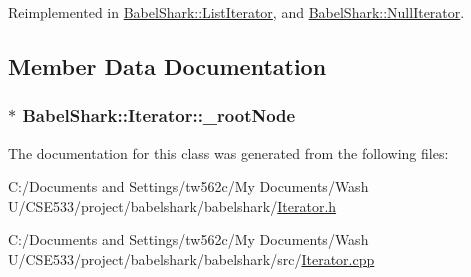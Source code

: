 Reimplemented in \hyperlink{class_babel_shark_1_1_list_iterator_0a902e37bdb11742ed53edb631743ea4}{BabelShark::ListIterator}, and \hyperlink{class_babel_shark_1_1_null_iterator_66a47f978ee58a3ee639494aac25bb7c}{BabelShark::NullIterator}.

\subsection{Member Data Documentation}
\hypertarget{class_babel_shark_1_1_iterator_383dec0e585b2a6dfe787c8cd5ba384a}{
\subsubsection[{\_\-rootNode}]{$\ast$ {\bf BabelShark::Iterator::\_\-rootNode}}}
\label{class_babel_shark_1_1_iterator_383dec0e585b2a6dfe787c8cd5ba384a}




The documentation for this class was generated from the following files:\begin{CompactItemize}
\item 
C:/Documents and Settings/tw562c/My Documents/Wash U/CSE533/project/babelshark/babelshark/\hyperlink{_iterator_8h}{Iterator.h}\item 
C:/Documents and Settings/tw562c/My Documents/Wash U/CSE533/project/babelshark/babelshark/src/\hyperlink{_iterator_8cpp}{Iterator.cpp}\end{CompactItemize}
